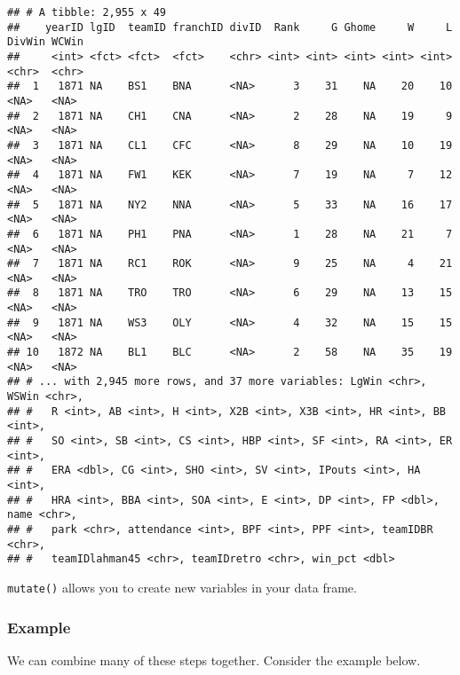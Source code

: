 \documentclass[
]{article}
\newenvironment{Shaded}{\begin{snugshade}}{\end{snugshade}}
\newcommand{\DataTypeTok}[1]{\textcolor[rgb]{0.13,0.29,0.53}{#1}}
\newcommand{\DecValTok}[1]{\textcolor[rgb]{0.00,0.00,0.81}{#1}}
\newcommand{\KeywordTok}[1]{\textcolor[rgb]{0.13,0.29,0.53}{\textbf{#1}}}
\newcommand{\NormalTok}[1]{#1}
\newcommand{\OperatorTok}[1]{\textcolor[rgb]{0.81,0.36,0.00}{\textbf{#1}}}
\newcommand{\StringTok}[1]{\textcolor[rgb]{0.31,0.60,0.02}{#1}}
\begin{document}
\begin{verbatim}
## # A tibble: 2,955 x 49
##    yearID lgID  teamID franchID divID  Rank     G Ghome     W     L DivWin WCWin
##     <int> <fct> <fct>  <fct>    <chr> <int> <int> <int> <int> <int> <chr>  <chr>
##  1   1871 NA    BS1    BNA      <NA>      3    31    NA    20    10 <NA>   <NA> 
##  2   1871 NA    CH1    CNA      <NA>      2    28    NA    19     9 <NA>   <NA> 
##  3   1871 NA    CL1    CFC      <NA>      8    29    NA    10    19 <NA>   <NA> 
##  4   1871 NA    FW1    KEK      <NA>      7    19    NA     7    12 <NA>   <NA> 
##  5   1871 NA    NY2    NNA      <NA>      5    33    NA    16    17 <NA>   <NA> 
##  6   1871 NA    PH1    PNA      <NA>      1    28    NA    21     7 <NA>   <NA> 
##  7   1871 NA    RC1    ROK      <NA>      9    25    NA     4    21 <NA>   <NA> 
##  8   1871 NA    TRO    TRO      <NA>      6    29    NA    13    15 <NA>   <NA> 
##  9   1871 NA    WS3    OLY      <NA>      4    32    NA    15    15 <NA>   <NA> 
## 10   1872 NA    BL1    BLC      <NA>      2    58    NA    35    19 <NA>   <NA> 
## # ... with 2,945 more rows, and 37 more variables: LgWin <chr>, WSWin <chr>,
## #   R <int>, AB <int>, H <int>, X2B <int>, X3B <int>, HR <int>, BB <int>,
## #   SO <int>, SB <int>, CS <int>, HBP <int>, SF <int>, RA <int>, ER <int>,
## #   ERA <dbl>, CG <int>, SHO <int>, SV <int>, IPouts <int>, HA <int>,
## #   HRA <int>, BBA <int>, SOA <int>, E <int>, DP <int>, FP <dbl>, name <chr>,
## #   park <chr>, attendance <int>, BPF <int>, PPF <int>, teamIDBR <chr>,
## #   teamIDlahman45 <chr>, teamIDretro <chr>, win_pct <dbl>
\end{verbatim}

\texttt{mutate()} allows you to create new variables in your data frame.

\hypertarget{example}{%
\subsubsection{Example}\label{example}}

We can combine many of these steps together. Consider the example below.

\begin{Shaded}
\end{Shaded}
\end{document}
